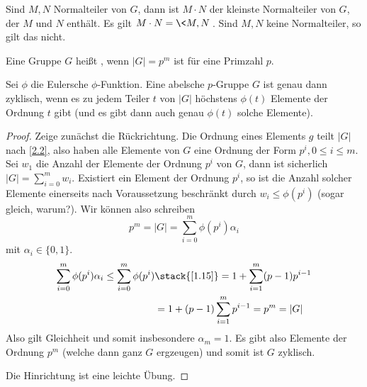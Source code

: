 \begin{nt*}
	Sind $M, N$ Normalteiler von $G$, dann ist $M \cdot N$ der kleinste Normalteiler von $G$, der $M$ und $N$ enthält.
	Es gilt $M \cdot N = \<M, N\>$.
	Sind $M, N$ keine Normalteiler, so gilt das nicht.
\end{nt*}

\begin{df*}
	Eine Gruppe $G$ heißt , wenn $|G| = p^m$ ist für eine Primzahl $p$.
\end{df*}

\begin{lem} \label{2.6}
	Sei $\phi$ die Eulersche $\phi$-Funktion.
	Eine abelsche $p$-Gruppe $G$ ist genau dann zyklisch, wenn es zu jedem Teiler $t$ von $|G|$ höchstens $\phi(t)$ Elemente der Ordnung $t$ gibt (und es gibt dann auch genau $\phi(t)$ solche Elemente).
	\begin{proof}
		Zeige zunächst die Rückrichtung.
		Die Ordnung eines Elements $g$ teilt $|G|$ nach \ref{2.2}, also haben alle Elemente von $G$ eine Ordnung der Form $p^i, 0 \le i \le m$.
		Sei $w_1$ die Anzahl der Elemente der Ordnung $p^i$ von $G$, dann ist
		sicherlich $|G| = \sum_{i=0}^m w_i$.
		Existiert ein Element der Ordnung $p^i$, so ist die Anzahl solcher Elemente einerseits nach Voraussetzung beschränkt durch $w_i \le \phi(p^i)$ (sogar gleich, warum?). %
		Wir können also schreiben
		\[
			p^m = |G|
			= \sum_{i=0}^m \phi(p^i) \alpha_i
		\]
		mit $\alpha_i \in \{0, 1\}$.
		\begin{align*}
			\sum_{i=0}^m \phi(p^i) \alpha_i
			\le \sum_{i=0}^m \phi(p^i)
			&\stack{\ref{1.15}}= 1 + \sum_{i=1}^m (p-1)p^{i-1} \\
			&= 1 + (p-1) \sum_{i=1}^m p^{i-1}
			= p^m
			= |G|
		\end{align*}
		Also gilt Gleichheit und somit insbesondere $\alpha_m = 1$.
		Es gibt also Elemente der Ordnung $p^m$ (welche dann ganz $G$ ergzeugen) und somit ist $G$ zyklisch.

		Die Hinrichtung ist eine leichte Übung. \Exercise
	\end{proof}
\end{lem}


